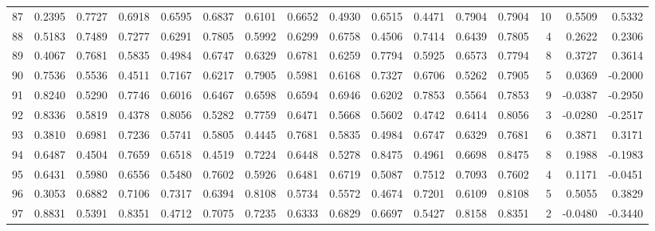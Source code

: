 \begin{tabular}{lrrrrrrrrrrrrrrr}
87  &      0.2395 &  0.7727 &  0.6918 &  0.6595 &  0.6837 &  0.6101 &  0.6652 &  0.4930 &  0.6515 &  0.4471 &   0.7904 &     0.7904 &     10 &                    0.5509 &                     0.5332 \\
88  &      0.5183 &  0.7489 &  0.7277 &  0.6291 &  0.7805 &  0.5992 &  0.6299 &  0.6758 &  0.4506 &  0.7414 &   0.6439 &     0.7805 &      4 &                    0.2622 &                     0.2306 \\
89  &      0.4067 &  0.7681 &  0.5835 &  0.4984 &  0.6747 &  0.6329 &  0.6781 &  0.6259 &  0.7794 &  0.5925 &   0.6573 &     0.7794 &      8 &                    0.3727 &                     0.3614 \\
90  &      0.7536 &  0.5536 &  0.4511 &  0.7167 &  0.6217 &  0.7905 &  0.5981 &  0.6168 &  0.7327 &  0.6706 &   0.5262 &     0.7905 &      5 &                    0.0369 &                    -0.2000 \\
91  &      0.8240 &  0.5290 &  0.7746 &  0.6016 &  0.6467 &  0.6598 &  0.6594 &  0.6946 &  0.6202 &  0.7853 &   0.5564 &     0.7853 &      9 &                   -0.0387 &                    -0.2950 \\
92  &      0.8336 &  0.5819 &  0.4378 &  0.8056 &  0.5282 &  0.7759 &  0.6471 &  0.5668 &  0.5602 &  0.4742 &   0.6414 &     0.8056 &      3 &                   -0.0280 &                    -0.2517 \\
93  &      0.3810 &  0.6981 &  0.7236 &  0.5741 &  0.5805 &  0.4445 &  0.7681 &  0.5835 &  0.4984 &  0.6747 &   0.6329 &     0.7681 &      6 &                    0.3871 &                     0.3171 \\
94  &      0.6487 &  0.4504 &  0.7659 &  0.6518 &  0.4519 &  0.7224 &  0.6448 &  0.5278 &  0.8475 &  0.4961 &   0.6698 &     0.8475 &      8 &                    0.1988 &                    -0.1983 \\
95  &      0.6431 &  0.5980 &  0.6556 &  0.5480 &  0.7602 &  0.5926 &  0.6481 &  0.6719 &  0.5087 &  0.7512 &   0.7093 &     0.7602 &      4 &                    0.1171 &                    -0.0451 \\
96  &      0.3053 &  0.6882 &  0.7106 &  0.7317 &  0.6394 &  0.8108 &  0.5734 &  0.5572 &  0.4674 &  0.7201 &   0.6109 &     0.8108 &      5 &                    0.5055 &                     0.3829 \\
97  &      0.8831 &  0.5391 &  0.8351 &  0.4712 &  0.7075 &  0.7235 &  0.6333 &  0.6829 &  0.6697 &  0.5427 &   0.8158 &     0.8351 &      2 &                   -0.0480 &                    -0.3440 \\

\end{tabular}
